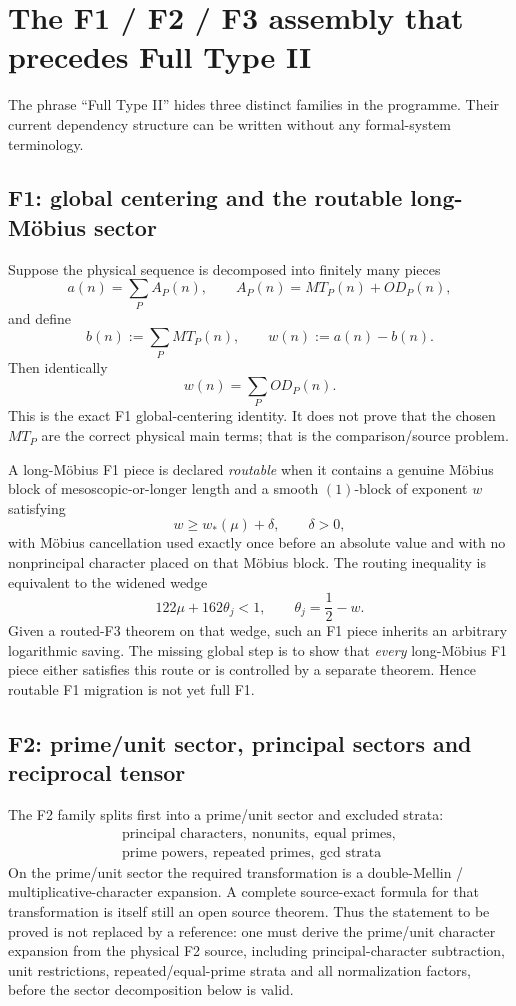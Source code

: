 \documentclass[11pt]{article}
\theoremstyle{definition}
\theoremstyle{remark}
\newcommand{\1}{\mathbf 1}
\begin{document}
\section{The F1 / F2 / F3 assembly that precedes Full Type II}
\label{sec:F123}

The phrase ``Full Type II'' hides three distinct families in the programme.  Their current dependency structure
can be written without any formal-system terminology.

\subsection{F1: global centering and the routable long-M\"obius sector}

Suppose the physical sequence is decomposed into finitely many pieces
\[
 a(n)=\sum_P A_P(n),
 \qquad
 A_P(n)=MT_P(n)+OD_P(n),
\]
and define
\[
 b(n):=\sum_PMT_P(n),\qquad w(n):=a(n)-b(n).
\]
Then identically
\[
 \boxed{w(n)=\sum_POD_P(n).}
\tag{F1-center}
\]
This is the exact F1 global-centering identity.  It does not prove that the chosen $MT_P$ are the correct physical
main terms; that is the comparison/source problem.

A long-M\"obius F1 piece is declared \emph{routable} when it contains a genuine M\"obius block of
mesoscopic-or-longer length and a smooth $(1)$-block of exponent $w$ satisfying
\[
 w\ge w_*(\mu)+\delta,
 \qquad \delta>0,
\tag{F1-route}
\]
with M\"obius cancellation used exactly once before an absolute value and with no nonprincipal character placed
on that M\"obius block.  The routing inequality is equivalent to the widened wedge
\[
 \boxed{122\mu+162\theta_j<1,
 \qquad \theta_j=\frac12-w.}
\tag{F1-wedge}
\]
Given a routed-F3 theorem on that wedge, such an F1 piece inherits an arbitrary logarithmic saving.  The missing
global step is to show that \emph{every} long-M\"obius F1 piece either satisfies this route or is controlled by a
separate theorem.  Hence routable F1 migration is not yet full F1.

\subsection{F2: prime/unit sector, principal sectors and reciprocal tensor}

The F2 family splits first into a prime/unit sector and excluded strata:
\[
 \boxed{\begin{array}{c}
 \text{principal characters},\ \text{nonunits},\ \text{equal primes},\\
 \text{prime powers},\ \text{repeated primes},\ \text{gcd strata}
 \end{array}}
\tag{F2-strata}
\]
On the prime/unit sector the required transformation is a double-Mellin / multiplicative-character expansion.
A complete source-exact formula for that transformation is itself still an open source theorem.  Thus the
statement to be proved is not replaced by a reference: one must derive the prime/unit character expansion from
the physical F2 source, including principal-character subtraction, unit restrictions, repeated/equal-prime
strata and all normalization factors, before the sector decomposition below is valid.
\end{document}
